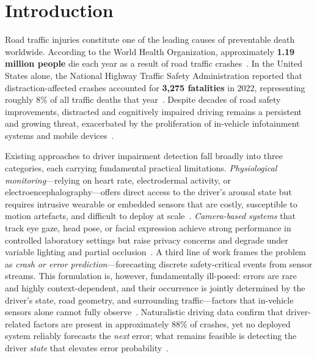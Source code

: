 \section{Introduction}
\label{sec:intro}

Road traffic injuries constitute one of the leading causes of preventable death worldwide.
According to the World Health Organization, approximately \textbf{1.19 million people} die each year
as a result of road traffic crashes~\cite{WHO2023}.
In the United States alone, the National Highway Traffic Safety Administration reported that
distraction-affected crashes accounted for \textbf{3,275 fatalities} in 2022,
representing roughly 8\% of all traffic deaths that year~\cite{NHTSA2025}.
Despite decades of road safety improvements, distracted and cognitively impaired driving
remains a persistent and growing threat, exacerbated by the proliferation of in-vehicle
infotainment systems and mobile devices~\cite{Young2007, Kaplan2015}.

Existing approaches to driver impairment detection fall broadly into three categories,
each carrying fundamental practical limitations.
\textit{Physiological monitoring}---relying on heart rate, electrodermal activity, or
electroencephalography---offers direct access to the driver's arousal state but requires
intrusive wearable or embedded sensors that are costly, susceptible to motion artefacts,
and difficult to deploy at scale~\cite{Healey2005}.
\textit{Camera-based systems} that track eye gaze, head pose, or facial expression achieve
strong performance in controlled laboratory settings but raise privacy concerns and
degrade under variable lighting and partial occlusion~\cite{Vora2018}.
A third line of work frames the problem as \textit{crash or error prediction}---forecasting
discrete safety-critical events from sensor streams.
This formulation is, however, fundamentally ill-posed: errors are rare and highly
context-dependent, and their occurrence is jointly determined by the driver's state,
road geometry, and surrounding traffic---factors that in-vehicle sensors alone cannot
fully observe~\cite{Dingus2016}.
Naturalistic driving data confirm that driver-related factors are present in approximately
88\% of crashes, yet no deployed system reliably forecasts the \textit{next} error;
what remains feasible is detecting the driver \textit{state} that elevates error probability~\cite{Dingus2016}.

